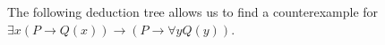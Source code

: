 \begin{exl}
\label{exl:CounterexamplePred}
The following deduction tree allows us to find a counterexample for $\exists x(P \to Q(x)) \to (P \to \forall y Q(y))$.
\begin{prooftree}
\end{prooftree}
\end{exl}